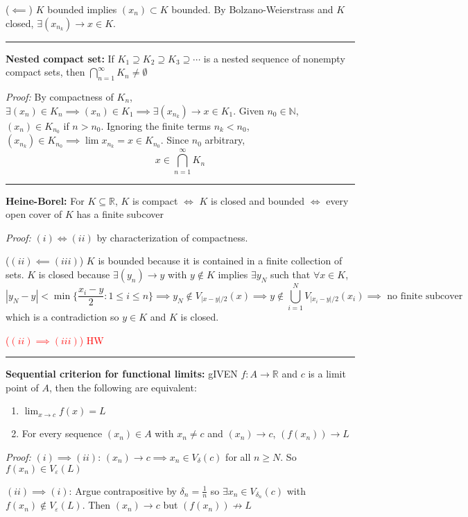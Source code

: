 \documentclass[12pt]{article}
\newcommand{\R}{\mathbb{R}}
\newcommand{\N}{\mathbb{N}}
\newcommand{\abs}[1]{\left\vert #1 \right\vert}
\newcommand{\ep}{\varepsilon}
\renewcommand{\hline}{\vspace*{10pt} \hrule \vspace*{10pt}}
\begin{document}
    ($\impliedby$) $K$ bounded implies $(x_n) \subset K$ bounded. By Bolzano-Weierstrass and $K$ closed, $\exists (x_{n_k}) \to x \in K$.  

    \hline 

    \textbf{Nested compact set:} If $K_1 \supseteq K_2 \supseteq K_3 \supseteq \cdots$ is a nested sequence of nonempty compact sets, then $\bigcap_{n=1}^{\infty} K_n \neq \emptyset$

    \emph{Proof:} By compactness of $K_n$, $\exists (x_n) \in K_n \implies (x_n) \in K_1 \implies \exists (x_{n_k}) \to x \in K_1$. Given $n_0 \in \N$, $(x_n) \in K_{n_0}$ if $n> n_0$. Ignoring the finite terms $n_k < n_0$, $(x_{n_k}) \in K_{n_0} \implies \lim x_{n_k} = x \in K_{n_0}$. Since $n_0$ arbitrary, 
    \[x \in \bigcap_{n=1}^{\infty} K_n\]

    \hline 

    \textbf{Heine-Borel:} For $K \subseteq \R$, $K$ is compact $\iff$ $K$ is closed and bounded $\iff$ every open cover of $K$ has a finite subcover

    \emph{Proof:} $(i) \iff (ii)$ by characterization of compactness. 
    
    ($(ii) \impliedby (iii)$) $K$ is bounded because it is contained in a finite collection of sets. $K$ is closed because $\exists (y_n) \to y$ with $y \notin K$ implies $\exists y_N$ such that $\forall x \in K$, 
    \[\abs{y_N - y} < \min\{\frac{x_i - y}{2}: 1 \leq i \leq n\} \implies y_N \notin V_{\abs{x - y}/2}(x) \implies y \notin \bigcup_{i=1}^N V_{\abs{x_i - y}/2}(x_i) \implies \text{ no finite subcover}\]
    which is a contradiction so $y \in K$ and $K$ is closed. 

    \textcolor{red}{($(ii) \implies (iii)$) HW }

    \hline 

    \textbf{Sequential criterion for functional limits:} gIVEN $f: A \to \R$ and $c$ is a limit point of $A$, then the following are equivalent:
    \begin{enumerate}
        \item  $\lim_{x \to c} f(x) = L$
        \item For every sequence $(x_n) \in A$ with $x_n \neq c$ and $(x_n) \to c$, $(f(x_n)) \to L$
    \end{enumerate}

    \emph{Proof:} $(i) \implies (ii)$: $(x_n) \to c \implies x_n \in V_{\delta}(c)$ for all $n \geq N$. So $f(x_n) \in V_{\ep}(L)$

    $(ii) \implies (i)$: Argue contrapositive by $\delta_n = \frac{1}{n}$ so $\exists x_n \in V_{\delta_n}(c)$ with $f(x_n) \notin V_{\ep}(L)$. Then $(x_n) \to c$ but $(f(x_n)) \not\to L$
\end{document}
